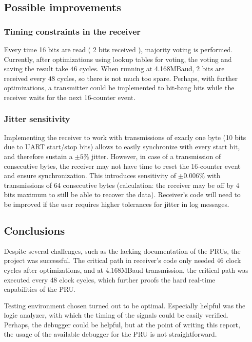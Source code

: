 \documentclass[a4,11pt]{article}
\begin{document}
\subsection{Possible improvements}

\subsubsection{Timing constraints in the receiver}
Every time 16 bits are read ( 2 bits received ), majority voting is performed. Currently, after optimizations using lookup tables for voting, the voting and saving the result take $46$ cycles. When running at 4.168MBaud, 2 bits are received every $48$ cycles, so there is not much too spare. Perhaps, with further optimizations, a transmitter could be implemented to bit-bang bits while the receiver waits for the next 16-counter event.

\subsubsection{Jitter sensitivity}
Implementing the receiver to work with transmissions of exacly one byte (10 bits due to UART start/stop bits) allows to easily synchronize with every start bit, and therefore sustain a $\pm5\%$ jitter. However, in case of a transmission of consecutive bytes, the receiver may not have time to reset the 16-counter event and ensure synchronization. This introduces sensitivity of $\pm0.006\%$ with transmissions of 64 consecutive bytes (calculation: the receiver may be off by 4 bits maximum to still be able to recover the data). Receiver's code will need to be improved if the user requires higher tolerances for jitter in log messages.

\subsection{Conclusions}

Despite several challenges, such as the lacking documentation of the PRUs, the project was successful.
The critical path in receiver's code only needed 46 clock cycles after optimizations, and at 4.168MBaud transmission, the critical path was executed every 48 clock cycles, which further proofs the hard real-time capabilities of the PRU.

Testing environment chosen turned out to be optimal. Especially helpful was the logic analyzer, with which
the timing of the signals could be easily verified. Perhaps, the debugger could be helpful, but at the point
of writing this report, the usage of the available debugger for the PRU is not straightforward.
\end{document}

